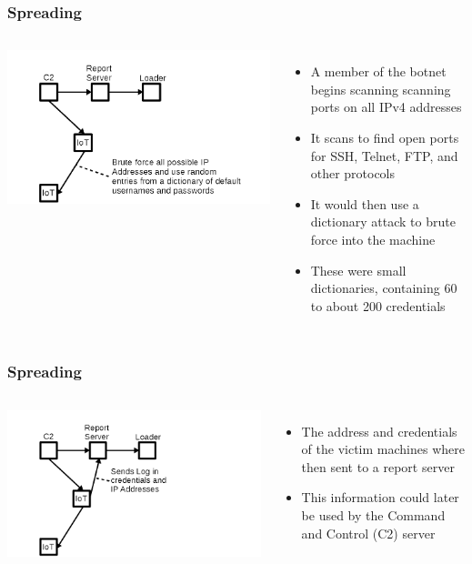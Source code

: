 \documentclass{beamer}
\begin{document}
\begin{frame}
	\frametitle{Spreading}
	\begin{columns}
			\includegraphics[width=\textwidth]{fig1.png}
			\begin{itemize}
				\item A member of the botnet begins scanning scanning ports on all IPv4 addresses
				\item It scans to find open ports for SSH, Telnet, FTP, and other protocols
				\item It would then use a dictionary attack to brute force into the machine
				\item These were small dictionaries, containing 60 to about 200 credentials
			\end{itemize}
	\end{columns}
\end{frame}

\begin{frame}
	\frametitle{Spreading}
	\begin{columns}
		\column{0.5\linewidth}
			\includegraphics[width=\textwidth]{fig2.png}
		\column{0.5\linewidth}
			\begin{itemize}
				\item The address and credentials of the victim machines where then sent to a report server
				\item This information could later be used by the Command and Control (C2) server
			\end{itemize}
	\end{columns}
\end{frame}
\end{document}
